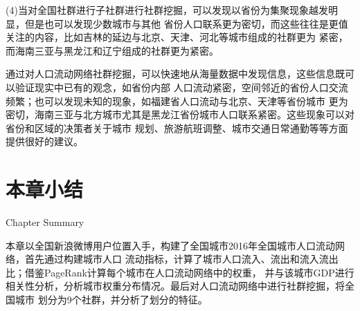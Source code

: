 (4)当对全国社群进行子社群进行社群挖掘，可以发现以省份为集聚现象越发明显，但是也可以发现少数城市与其他
省份人口联系更为密切，而这些往往是更值关注的内容，比如吉林的延边与北京、天津、河北等城市组成的社群更为
紧密，而海南三亚与黑龙江和辽宁组成的社群更为紧密。

通过对人口流动网络社群挖掘，可以快速地从海量数据中发现信息，这些信息既可以验证现实中已有的观念，如省份内部
人口流动紧密，空间邻近的省份人口交流频繁；也可以发现未知的现象，如福建省人口流动与北京、天津等省份城市
更为密切，海南三亚与北方城市尤其是黑龙江省份城市人口联系紧密。这些现象可以对省份和区域的决策者关于城市
规划、旅游航班调整、城市交通日常通勤等等方面提供很好的建议。

\section{本章小结}{Chapter Summary}

本章以全国新浪微博用户位置入手，构建了全国城市2016年全国城市人口流动网络，首先通过构建城市人口
流动指标，计算了城市人口流入、流出和流入流出比；借鉴PageRank计算每个城市在人口流动网络中的权重，
并与该城市GDP进行相关性分析，分析城市权重分布情况。最后对人口流动网络中进行社群挖掘，将全国城市
划分为9个社群，并分析了划分的特征。
